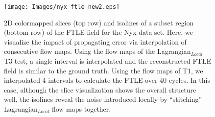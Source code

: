 \begin{figure}[!t]
\centering
\texttt{[image: Images/nyx\_ftle\_new2.eps]}
\caption{{2D colormapped slices (top row) and isolines of a subset region (bottom row) of the FTLE field for the Nyx data set. Here, we visualize the impact of propagating error via interpolation of consecutive flow maps. Using the flow maps of the Lagrangian$_{Local}$ T3 test, a single interval is interpolated and the reconstructed FTLE field is similar to the ground truth. Using the flow maps of T1, we interpolated 4 intervals to calculate the FTLE over 40 cycles. In this case, although the slice visualization shows the overall structure well, the isolines reveal the noise introduced locally by ``stitching'' Lagrangian$_{Local}$ flow maps together.}}
\label{nyx_ftle}
\vspace{-5mm}
\end{figure}
